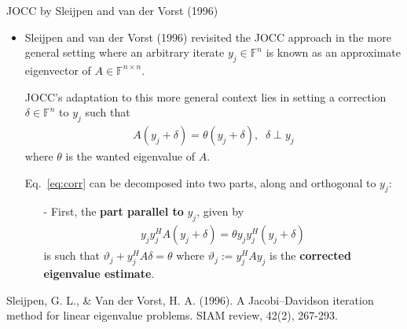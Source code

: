 \documentclass[t,usepdftitle=false]{beamer}
\begin{document}
\begin{frame}{JOCC by Sleijpen and van der Vorst (1996)}
\begin{itemize}
\item Sleijpen and van der Vorst (1996) revisited the JOCC approach in the more general setting where an arbitrary iterate $y_j\in\mathbb{F}^n$ is known as an approximate eigenvector of $A\in\mathbb{F}^{n\times n}$.
\item[] JOCC's adaptation to this more general context lies in setting a correction $\delta\in\mathbb{F}^n$ to $y_j$ such that
\begin{align}\label{eq:corr}
A(y_j+\delta)=\theta(y_j+\delta),\;\;
\delta\perp y_j
\end{align} 
where $\theta$ is the wanted eigenvalue of $A$.
\item[] Eq.~\eqref{eq:corr} can be decomposed into two parts, along and orthogonal to $y_j$:
\begin{itemize}\normalsize
\item[-] First, the \textbf{part parallel to} $y_j$, given by
\begin{align*}
y_jy_j^HA(y_j+\delta)=\theta y_jy_j^H(y_j+\delta)
\end{align*}
is such that $\boxed{\vartheta_j+y_j^HA\delta=\theta}$ where $\boxed{\vartheta_j:=y_j^HAy_j}$ is the \textbf{corrected eigenvalue estimate}.
\end{itemize}
\end{itemize}\smallskip
\tiny{Sleijpen, G. L., \& Van der Vorst, H. A. (1996). A Jacobi--Davidson iteration method for linear eigenvalue problems. SIAM review, 42(2), 267-293.}
\end{frame}
\end{document}
